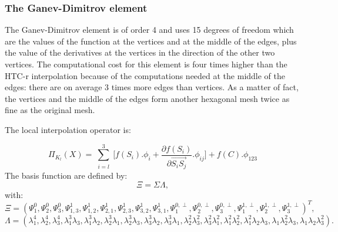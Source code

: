 \documentclass[proc]{edpsmath}
\begin{document}
\subsubsection{The Ganev-Dimitrov element}
The Ganev-Dimitrov element is of order 4 and uses 15 degrees of freedom which are the values of the function at the vertices and at the middle of the edges, plus the value of the derivatives at the vertices in the direction of the other two vertices. The computational cost for this element is four times higher than the HTC-r interpolation because of the computations needed at the middle of the edges: there are on average 3 times more edges than vertices. As a matter of fact, the vertices and the middle of the edges form another hexagonal mesh twice as fine as the original mesh. 

\noindent The local interpolation operator is:

\begin{equation*}
 \Pi_{K_l} (X) = \sum \limits_{\substack{i=l }}^{3}{ [f(S_i).\phi_i +  \frac{\partial f(S_i)}{\partial  \overrightarrow{ S_i S_j } }.\phi_{ij} } ]  + f(C).\phi_{123}
\end{equation*}
\noindent The basis function are defined by: 
\begin{equation*}
\Xi =  \Sigma \Lambda,
\end{equation*} 
 \noindent with:\\
\begin{equation*}
\Xi=(\Psi_1^0, \Psi_2^0, \Psi_3^0, \Psi_{1,3}^1,\Psi_{1,2}^1,\Psi_{2,1}^1,\Psi_{2,3}^1 ,\Psi_{3,2}^1,\Psi_{3,1}^1,\Psi_1^{0,\perp} ,\Psi_2^{0,\perp},\Psi_3^{0,\perp},\Psi_1^{1,\perp},\Psi_2^{1,\perp},\Psi_3^{1,\perp})^T,
\end{equation*} 
\begin{equation*}
\Lambda = ( \lambda_1^4,\lambda_2^4,\lambda_3^4,\lambda_1^3\lambda_3,\lambda_1^3\lambda_2,\lambda_2^3\lambda_1,\lambda_2^3\lambda_3 ,\lambda_3^3\lambda_2,\lambda_3^3\lambda_1,\lambda_2^2\lambda_3^2,\lambda_3^2\lambda_1^2,\lambda_1^2\lambda_2^2,\lambda_1^2\lambda_2\lambda_3,\lambda_1\lambda_2^2\lambda_3,\lambda_1\lambda_2\lambda_3^2).
\end{equation*} 
  
\end{document}

